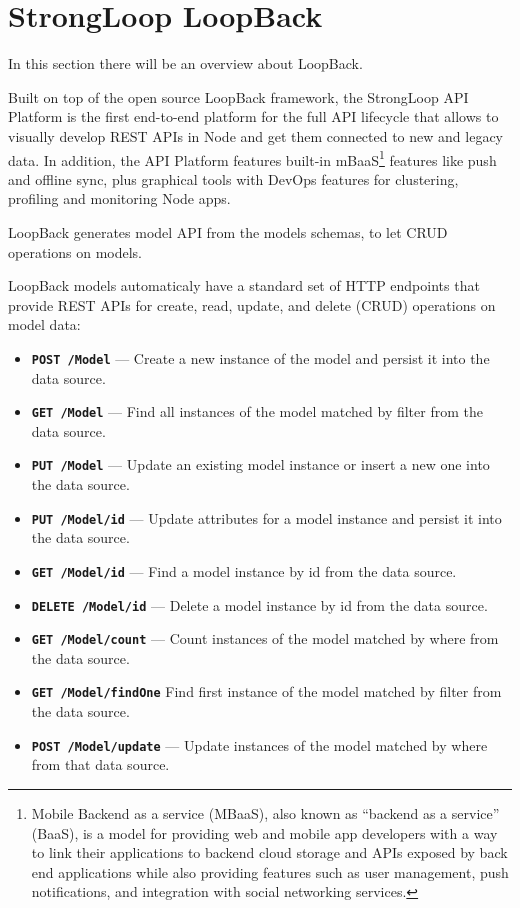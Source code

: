 \section{StrongLoop LoopBack}
\label{sec:TCH_loopback}

In this section there will be an overview about LoopBack.

Built on top of the open source LoopBack framework, the StrongLoop API Platform is the first end-to-end platform for the full API lifecycle that allows to visually develop REST APIs in Node and get them connected to new and legacy data. In addition, the API Platform features built-in mBaaS\footnote{Mobile Backend as a service (MBaaS), also known as ``backend as a service'' (BaaS), is a model for providing web and mobile app developers with a way to link their applications to backend cloud storage and APIs exposed by back end applications while also providing features such as user management, push notifications, and integration with social networking services.} features like push and offline sync, plus graphical tools with DevOps features for clustering, profiling and monitoring Node apps.

LoopBack generates model API from the models schemas, to let CRUD operations on models.

LoopBack models automaticaly have a standard set of HTTP endpoints that provide REST APIs for create, read, update, and delete (CRUD) operations on model data:
\begin{itemize}
\item \texttt{\textbf{POST /Model}} — Create a new instance of the model and persist it into the data source.
\item \texttt{\textbf{GET /Model}} — Find all instances of the model matched by filter from the data source.
\item \texttt{\textbf{PUT /Model}} — Update an existing model instance or insert a new one into the data source.
\item \texttt{\textbf{PUT /Model/{id}}} — Update attributes for a model instance and persist it into the data source.
\item \texttt{\textbf{GET /Model/{id}}} — Find a model instance by id from the data source.
\item \texttt{\textbf{DELETE /Model/{id}}} — Delete a model instance by id from the data source.
\item \texttt{\textbf{GET /Model/count}} — Count instances of the model matched by where from the data source.
\item \texttt{\textbf{GET /Model/findOne}} Find first instance of the model matched by filter from the data source.
\item \texttt{\textbf{POST /Model/update}} — Update instances of the model matched by where from that data source.
\end{itemize}


